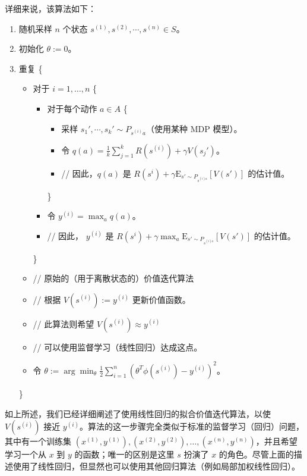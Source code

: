 详细来说，该算法如下：
\begin{enumerate}
    \item 随机采样 $n$ 个状态 $s^{(1)}, s^{(2)}, \cdots, s^{(n)} \in S$。
    \item 初始化 $\theta := 0$。
    \item 重复 \{
        \begin{itemize}
            \item[] 对于 $i = 1, \dots, n$ \{
                \begin{itemize}
                    \item[] 对于每个动作 $a \in A$ \{
                        \begin{itemize}
                            \item[] 采样 $s_1', \cdots, s_k' \sim P_{s^{(i)} a}$（使用某种 MDP 模型）。
                            \item[] 令 $q(a)=\frac1k \sum_{j=1}^{k} R(s^{(i)}) + \gamma V(s_j')$。
                            \item[] \qquad // 因此，$q(a)$ 是 $R(s^{i}) + \gamma \mathrm{E}_{s'\sim P_{s^{(i) a}}}[V(s')]$ 的估计值。
                        \end{itemize}

                    \}
                    \item[] 令 $y^{(i)} = \max_a q(a)$。
                    \item[] \qquad // 因此， $y^{(i)}$ 是 $R(s^{i}) + \gamma \max_a \mathrm{E}_{s'\sim P_{s^{(i) a}}}[V(s')]$ 的估计值。
                \end{itemize}
            \}
            \item[] // 原始的（用于离散状态的）价值迭代算法
            \item[] // 根据 $V(s^{(i)}) := y^{(i)}$ 更新价值函数。
            \item[] // 此算法则希望 $V(s^{(i)}) \approx y^{(i)}$
            \item[] // 可以使用监督学习（线性回归）达成这点。
            \item[] 令 $\theta := \arg\min_\theta \frac12 \sum_{i=1}^{n} \left(\theta^T \phi(s^{(i)}) - y^{(i)}\right)^2$。
        \end{itemize}
        
    \}
\end{enumerate}

如上所述，我们已经详细阐述了使用线性回归的拟合价值迭代算法，以使 $V(s^{(i)})$ 接近 $y^{(i)}$。算法的这一步骤完全类似于标准的监督学习（回归）问题，其中有一个训练集 $(x^{(1)}, y^{(1)}), (x^{(2)}, y^{(2)}), \dots, (x^{(n)}, y^{(n)})$，并且希望学习一个从 $x$ 到 $y$ 的函数；唯一的区别是这里 $s$ 扮演了 $x$ 的角色。尽管上面的描述使用了线性回归，但显然也可以使用其他回归算法（例如局部加权线性回归）。

